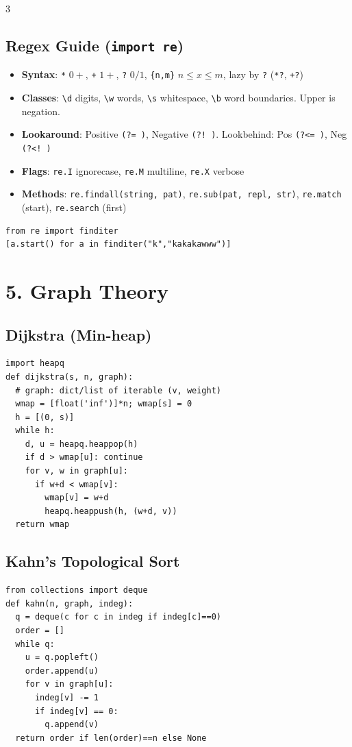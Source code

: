 \documentclass[8pt,a4paper,landscape]{extarticle}
\begin{document}
\begin{multicols*}{3}
\subsection*{Regex Guide (\texttt{import re})}
\begin{itemize}[leftmargin=*,noitemsep,topsep=0pt]
  \item \textbf{Syntax}: \verb|*| $0+$, \verb|+| $1+$, \verb|?| $0/1$, \verb|{n,m}| $n \le x \le m$, lazy by \verb|?| (\verb|*?|, \verb|+?|)
  \item \textbf{Classes}: \verb|\d| digits, \verb|\w| words, \verb|\s| whitespace, \verb|\b| word boundaries. Upper is negation.
  \item \textbf{Lookaround}: Positive \verb|(?= )|, Negative \verb|(?! )|. Lookbehind: Pos \verb|(?<= )|, Neg \verb|(?<! )|
  \item \textbf{Flags}: \texttt{re.I} ignorecase, \texttt{re.M} multiline, \texttt{re.X} verbose
  \item \textbf{Methods}: \texttt{re.findall(string, pat)}, \texttt{re.sub(pat, repl, str)}, \texttt{re.match} (start), \texttt{re.search} (first)
\end{itemize}
\begin{lstlisting}
from re import finditer
[a.start() for a in finditer("k","kakakawww")]
\end{lstlisting}

\section*{5. Graph Theory}
\subsection*{Dijkstra (Min-heap)}
\begin{lstlisting}
import heapq
def dijkstra(s, n, graph):
  # graph: dict/list of iterable (v, weight)
  wmap = [float('inf')]*n; wmap[s] = 0
  h = [(0, s)]
  while h:
    d, u = heapq.heappop(h)
    if d > wmap[u]: continue
    for v, w in graph[u]:
      if w+d < wmap[v]:
        wmap[v] = w+d
        heapq.heappush(h, (w+d, v))
  return wmap
\end{lstlisting}

\subsection*{Kahn's Topological Sort}
\begin{lstlisting}
from collections import deque
def kahn(n, graph, indeg):
  q = deque(c for c in indeg if indeg[c]==0)
  order = []
  while q:
    u = q.popleft()
    order.append(u)
    for v in graph[u]:
      indeg[v] -= 1
      if indeg[v] == 0:
        q.append(v)
  return order if len(order)==n else None
\end{lstlisting}


\end{multicols*}
\end{document}
